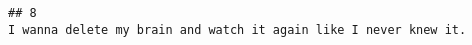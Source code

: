 \documentclass[
]{article}
\begin{document}
\begin{verbatim}
## 8                                                                                                                                                                                                                                                                                                                                                                                                                                                                                                                                                                                                                                                                                                                                                                                                                                                                                                                                                                                                                                                                                                                                                                                                                                                                                                                                                                                                                                                                                                                                                                                                                                                                                                                                                                                                                                                                                                                                                                                                                                                                                                                                                  I wanna delete my brain and watch it again like I never knew it.

\end{verbatim}
\end{document}
